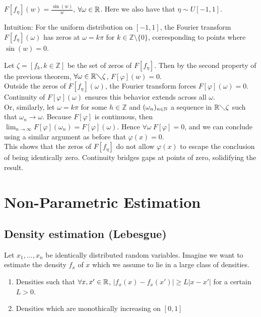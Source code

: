 \documentclass{article}
\begin{document}
\begin{example}
    \(F[f_{\eta}](w)=\frac{\sin(w)}{w}\), \(\forall \omega \in \mathbb{R}\). Here we also have that \(\eta \sim U[-1,1]\). 
    
    Intuition: For the uniform distribution on \([-1, 1]\), the Fourier transform \(F[f_\eta](\omega)\) has zeros at \(\omega = k\pi\) for \(k \in \mathbb{Z} \setminus \{0\}\), corresponding to points where \(\sin(w) = 0\).

    Let \(\zeta=\left[f_{k}, k\in \mathbb{Z}\right]\) be the set of zeros of \(F[f_{\eta}]\). Then by the second property of the previous theorem, \(\forall \omega \in \mathbb{R} \diagdown \zeta\), \(F[\varphi](w)=0\). \\ 
    
    Outside the zeros of \(F[f_\eta](\omega)\), the Fourier transform forces \(F[\varphi](\omega) = 0\). Continuity of \(F[\varphi](\omega)\) ensures this behavior extends across all \(\omega\). \\

    Or, similarly, let \(\omega=k\pi\) for some \(h \in \mathbb{Z}\) and \((\omega_{n})_{n \in \mathbb{N}}\) a sequence in \(\mathbb{R} \diagdown \zeta\) such that \(\omega_n \rightarrow \omega\). Because \(F[\varphi]\) is continuous, then \(\lim_{n\rightarrow \infty}F[\varphi](\omega_n)=F[\varphi](\omega)\). Hence \(\forall \omega \ F[\varphi]=0\), and we can conclude using a similar argument as before that \(\varphi(x)=0\). \\

    This shows that the zeros of \(F[f_\eta]\) do not allow \(\varphi(x)\) to escape the conclusion of being identically zero. Continuity bridges gaps at points of zero, solidifying the result.
\end{example}

\clearpage
\section{Non-Parametric Estimation}

\subsection{Density estimation (Lebesgue)}
Let \(x_{1},...,x_{n}\) be identically distributed random variables. Imagine we want to estimate the density \(f_x\) of \(x\) which we assume to lie in a large class of densities.

\begin{example}
    \begin{enumerate} We have two examples: \\
        \item Densities such that \(\forall x, x'\in \mathbb{R}\), \(|f_{x}(x)-f_{x}(x')| \geq L|x-x'|\) for a certain \(L>0\). 
        \item Densities which are monothically increasing on \([0,1]\)
    \end{enumerate}
\end{example}
\end{document}
